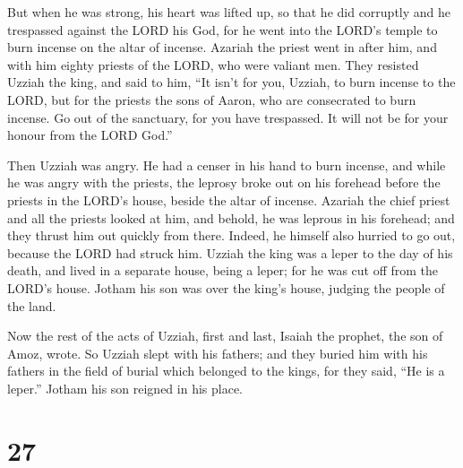  But when he was strong, his heart was lifted up, so that
he did corruptly and he trespassed against the LORD his God, for he went
into the LORD's temple to burn incense on the altar of incense.
 Azariah the priest went in after him, and with him
eighty priests of the LORD, who were valiant men.  They
resisted Uzziah the king, and said to him, ``It isn't for you, Uzziah,
to burn incense to the LORD, but for the priests the sons of Aaron, who
are consecrated to burn incense. Go out of the sanctuary, for you have
trespassed. It will not be for your honour from the LORD God.''

 Then Uzziah was angry. He had a censer in his hand to
burn incense, and while he was angry with the priests, the leprosy broke
out on his forehead before the priests in the LORD's house, beside the
altar of incense.  Azariah the chief priest and all the
priests looked at him, and behold, he was leprous in his forehead; and
they thrust him out quickly from there. Indeed, he himself also hurried
to go out, because the LORD had struck him.  Uzziah the
king was a leper to the day of his death, and lived in a separate house,
being a leper; for he was cut off from the LORD's house. Jotham his son
was over the king's house, judging the people of the land.

 Now the rest of the acts of Uzziah, first and last,
Isaiah the prophet, the son of Amoz, wrote.  So Uzziah
slept with his fathers; and they buried him with his fathers in the
field of burial which belonged to the kings, for they said, ``He is a
leper.'' Jotham his son reigned in his place.

\hypertarget{section-26}{%
\section{27}\label{section-26}}

